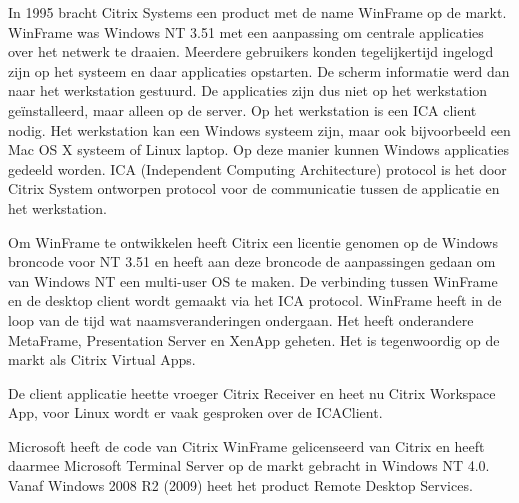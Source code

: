 In 1995 bracht Citrix Systems een product met de name WinFrame op de markt. WinFrame was Windows NT 3.51 met een aanpassing om centrale applicaties over het netwerk te draaien. Meerdere gebruikers konden tegelijkertijd ingelogd zijn op het systeem en daar applicaties opstarten. De scherm informatie werd dan naar het werkstation gestuurd. De applicaties zijn dus niet op het werkstation ge\"installeerd, maar alleen op de server. Op het werkstation is een ICA client nodig. Het werkstation kan een Windows systeem zijn, maar ook bijvoorbeeld een Mac OS X systeem of Linux laptop. Op deze manier kunnen Windows applicaties gedeeld worden. ICA (Independent Computing Architecture) protocol is het door Citrix System ontworpen protocol voor de communicatie tussen de applicatie en het werkstation.

Om WinFrame te ontwikkelen heeft Citrix een licentie genomen op de Windows broncode voor NT 3.51 en heeft aan deze broncode de aanpassingen gedaan om van Windows NT een multi-user OS te maken. De verbinding tussen WinFrame en de desktop client wordt gemaakt via het ICA protocol. WinFrame heeft in de loop van de tijd wat naamsveranderingen ondergaan. Het heeft onderandere MetaFrame, Presentation Server en XenApp geheten. Het is tegenwoordig op de markt als Citrix Virtual Apps.

De client applicatie heette vroeger Citrix Receiver en heet nu Citrix Workspace App, voor Linux wordt er vaak gesproken over de ICAClient.

Microsoft heeft de code van Citrix WinFrame gelicenseerd van Citrix en heeft daarmee Microsoft Terminal Server op de markt gebracht in Windows NT 4.0. Vanaf Windows 2008 R2 (2009) heet het product Remote Desktop Services.


